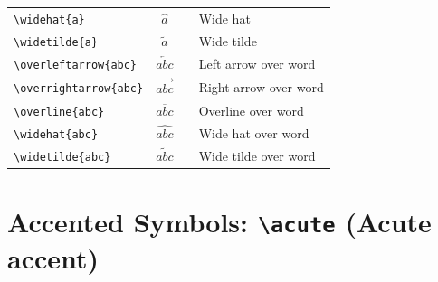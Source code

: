 \documentclass[12pt,a4paper]{article}
\begin{document}
\begin{tabular}{|l|c|c|l|}
\verb|\widehat{a}|         & $\widehat{a}$                    &                          & Wide hat \\
\verb|\widetilde{a}|       & $\widetilde{a}$                  &                          & Wide tilde \\
\verb|\overleftarrow{abc}| & $\overleftarrow{abc}$            &                          & Left arrow over word \\
\verb|\overrightarrow{abc}|& $\overrightarrow{abc}$           &                          & Right arrow over word \\
\verb|\overline{abc}|      & $\overline{abc}$                 &                          & Overline over word \\
\verb|\widehat{abc}|       & $\widehat{abc}$                  &                          & Wide hat over word \\
\verb|\widetilde{abc}|     & $\widetilde{abc}$                &                          & Wide tilde over word \\
\hline
\end{tabular}

\newpage

\section*{Accented Symbols: \texttt{\textbackslash acute} (Acute accent)}
\end{document}
